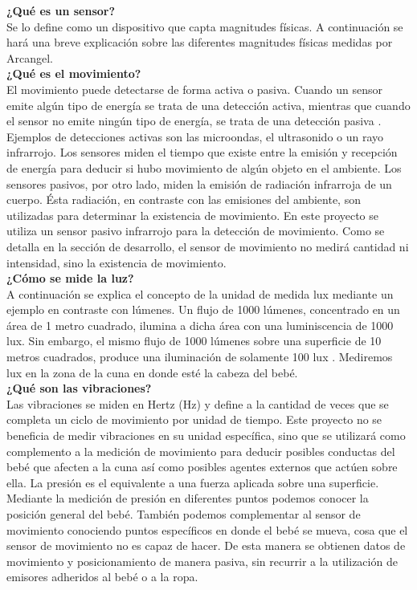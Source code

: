 \documentclass{IEEEtran}
\begin{document}
            \textbf{¿Qué es un sensor?}\\ 
            Se lo define como un dispositivo que capta magnitudes físicas. A continuación se hará una breve explicación sobre las diferentes magnitudes físicas medidas por Arcangel.\\
            
            \textbf{¿Qué es el movimiento?}\\ El movimiento puede detectarse de forma activa o pasiva. 
            Cuando un sensor emite algún tipo de energía se trata de una detección activa, mientras que cuando el sensor no emite ningún tipo de energía, se trata de una detección pasiva \cite{refmovimiento}.
            Ejemplos de detecciones activas son las microondas, el ultrasonido o un rayo infrarrojo. Los sensores miden el tiempo que existe entre la emisión y recepción de energía para deducir si hubo movimiento de algún objeto en el ambiente.
            Los sensores pasivos, por otro lado, miden la emisión de radiación infrarroja de un cuerpo. Ésta radiación, en contraste con las emisiones del ambiente, son utilizadas para determinar la existencia de movimiento.
            En este proyecto se utiliza un sensor pasivo infrarrojo para la detección de movimiento.
            Como se detalla en la sección de desarrollo, el sensor de movimiento no medirá cantidad ni intensidad, sino la existencia de movimiento.\\

            \textbf{¿Cómo se mide la luz?}\\ A continuación se explica el concepto de la unidad de medida lux mediante un ejemplo en contraste con lúmenes. Un flujo de 1000 lúmenes, concentrado en un área de 1 metro cuadrado, ilumina a dicha área con una luminiscencia de 1000 lux. Sin embargo, el mismo flujo de 1000 lúmenes sobre una superficie de 10 metros cuadrados, produce una iluminación de solamente 100 lux \cite{reflux}.  
Mediremos lux en la zona de la cuna en donde esté la cabeza del bebé.\\

\textbf{¿Qué son las vibraciones?}\\ Las vibraciones se miden en Hertz (Hz) y define a la cantidad de veces que se completa un ciclo de movimiento por unidad de tiempo. Este proyecto no se beneficia de medir vibraciones en su unidad específica, sino que se utilizará como complemento a la medición de movimiento para deducir posibles conductas del bebé que afecten a la cuna así como posibles agentes externos que actúen sobre ella.
La presión es el equivalente a una fuerza aplicada sobre una superficie. Mediante la medición de presión en diferentes puntos podemos conocer la posición general del bebé. También podemos complementar al sensor de movimiento conociendo puntos específicos en donde el bebé se mueva, cosa que el sensor de movimiento no es capaz de hacer. De esta manera se obtienen datos de movimiento y posicionamiento de manera pasiva, sin recurrir a la utilización de emisores adheridos al bebé o a la ropa.\\
\end{document}
